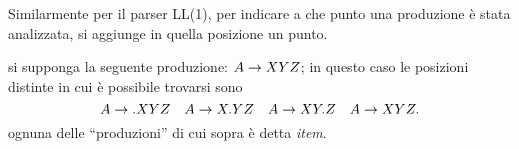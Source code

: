 \documentclass{subfiles}
\begin{document}
\noindent Similarmente per il parser LL(1), per indicare a che punto una produzione è stata analizzata, si aggiunge in quella posizione un punto.

\begin{Example*}
    si supponga la seguente produzione: \(\Grammar{A}{XYZ}\);
    in questo caso le posizioni distinte in cui è possibile trovarsi sono
    \[
        \Grammar{A}{.XYZ} \quad \Grammar{A}{X.YZ} \quad \Grammar{A}{XY.Z} \quad \Grammar{A}{XYZ.}
    \]
    ognuna delle ``produzioni'' di cui sopra è detta \emph{item}.
\end{Example*}
\end{document}
